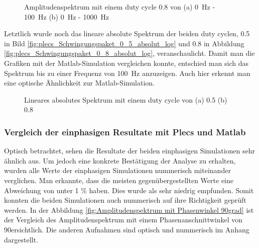 \begin{figure}[ht!]
	\centering
	\qquad
	\caption{Amplitudenspektrum mit einem duty cycle 0.8 von (a) \SI{0}{Hz} - \SI{100}{Hz} (b) \SI{0}{Hz} - \SI{1000}{Hz}}
	\label{fig:plecs_Schwingungspakete_Amplitudenspektrum_ 0_8_100_1000}
\end{figure}


Letztlich wurde noch das lineare absolute Spektrum der beiden duty cyclen, 0.5 in Bild \ref{fig:plecs_Schwingungspaket_0_5_absolut_log} und 0.8 in Abbildung \ref{fig:plecs_Schwingungspaket_0_8_absolut_log}, veranschaulicht. Damit man die Grafiken mit der Matlab-Simulation vergleichen konnte, entschied man sich das Spektrum bis zu einer Frequenz von \SI{100}{Hz} anzuzeigen. Auch hier erkennt man eine optische Ähnlichkeit zur Matlab-Simulation. 


\begin{figure}[ht!]
	\centering
	\qquad
	\caption{Lineares absolutes Spektrum mit einem duty cycle von (a) 0.5 (b) 0.8}
	\label{fig:plecs_Schwingungspakete_absolut log}
\end{figure}

\subsubsection{Vergleich der einphasigen Resultate mit Plecs und Matlab}

Optisch betrachtet, sehen die Resultate der beiden einphasigen Simulationen sehr ähnlich aus. Um jedoch eine konkrete Bestätigung der Analyse zu erhalten, wurden alle Werte der einphasigen Simulationen nummerisch miteinander verglichen. Man erkannte, dass die meisten gegenübergestellten Werte eine Abweichung von unter 1 \% haben. Dies wurde als sehr niedrig empfunden. Somit konnten die beiden Simulationen auch nummerisch auf ihre Richtigkeit geprüft werden. In der Abbildung \ref{fig:Amplitudenspektrum mit Phasenwinkel 90grad} ist der Vergleich des Amplitudenspektrum mit einem Phasenanschnittwinkel von 90\textdegree ersichtlich. Die anderen Aufnahmen sind optisch und nummerisch im Anhang dargestellt.



